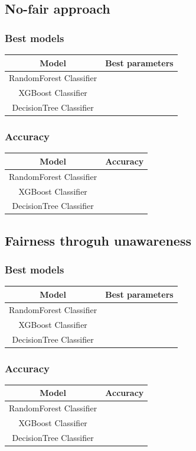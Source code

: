 \documentclass[12pt,a4paper,openright,twoside]{book}
\begin{document}
\subsection{No-fair approach}
\subsubsection{Best models}
\begin{tabular}{|c|c|}
    \hline
    \textbf{Model} & \textbf{Best parameters} \\
    \hline
    RandomForest Classifier  &  \\
    \hline
    XGBoost Classifier & \\
    \hline
    DecisionTree Classifier &  \\
    \hline
\end{tabular}

\subsubsection{Accuracy}
\begin{tabular}{|c|c|}
    \hline
    \textbf{Model} & \textbf{Accuracy} \\
    \hline
    RandomForest Classifier  &  \\
    \hline
    XGBoost Classifier & \\
    \hline
    DecisionTree Classifier &  \\
    \hline
\end{tabular}

\subsection{Fairness throguh unawareness}
\subsubsection{Best models}
\begin{tabular}{|c|c|}
    \hline
    \textbf{Model} & \textbf{Best parameters} \\
    \hline
    RandomForest Classifier  &  \\
    \hline
    XGBoost Classifier & \\
    \hline
    DecisionTree Classifier &  \\
    \hline
\end{tabular}

\subsubsection{Accuracy}
\begin{tabular}{|c|c|}
    \hline
    \textbf{Model} & \textbf{Accuracy} \\
    \hline
    RandomForest Classifier  &  \\
    \hline
    XGBoost Classifier & \\
    \hline
    DecisionTree Classifier &  \\
    \hline
\end{tabular}
\end{document}
